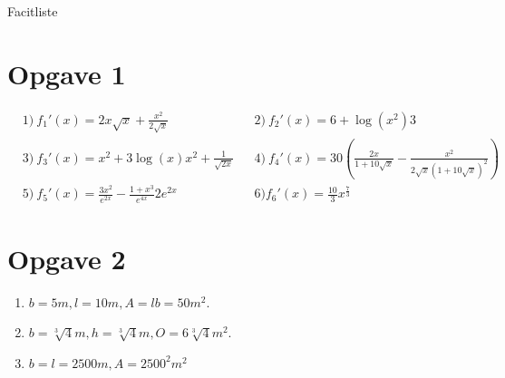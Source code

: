 \begin{center}
\Huge
Facitliste
\end{center}
\section*{Opgave 1}
\begin{align*}
&1) \ f_1'(x) = 2x\sqrt{x}+\frac{x^2}{2\sqrt{x}}  &&2)\ f_2'(x) = 6+\log(x^2)3 \\
&3) \ f_3'(x) = x^2 + 3\log(x)x^2 + \frac{1}{\sqrt{2x}}  &&4)\ f_4'(x) = 30\left(\frac{2x}{1+10\sqrt{x}}-\frac{x^2}{2\sqrt{x}(1+10\sqrt{x})^2}\right) \\
&5) \ f_5'(x) = \frac{3x^2}{e^{2x}} -\frac{1+x^3}{e^{4x}}2e^{2x}  &&6) f_6'(x) = \frac{10}{3}x^{\frac{7}{3}}  
\end{align*}
\section*{Opgave 2}
\begin{enumerate}[label=\roman*)]
\item $b = 5m, l = 10m, A =lb = 50m^2$.
\item $b=\sqrt[3]{4}m, h = \sqrt[3]{4}m, O = 6\sqrt[3]{4}m^2$.
\item $b=l=2500m, A = 2500^2m^2$
\end{enumerate}